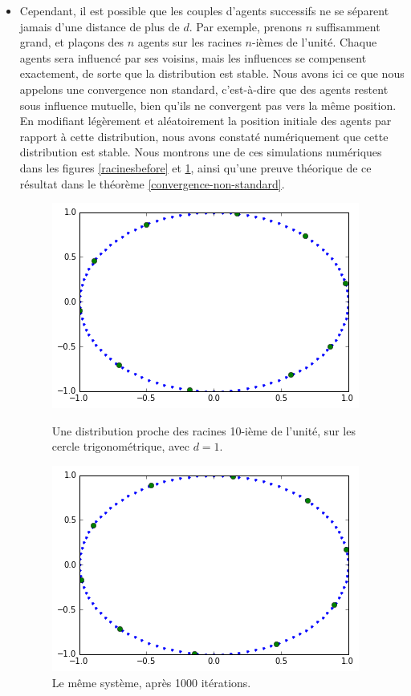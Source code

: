 \documentclass[a4paper,10pt]{article}
\begin{document}
\begin{itemize}
\item Cependant, il est possible que les couples d'agents successifs ne se séparent jamais d'une distance de plus de $d$. Par exemple, prenons $n$ suffisamment grand, et plaçons des $n$ agents sur les racines $n$-ièmes de l'unité. Chaque agents sera influencé par ses voisins, mais les influences se compensent exactement, de sorte que la distribution est stable. Nous avons ici ce que nous appelons une convergence non standard, c'est-à-dire que des agents restent sous influence mutuelle, bien qu'ils ne convergent pas vers la même position.
En modifiant légèrement et aléatoirement la position initiale des agents par rapport à cette distribution, nous avons constaté numériquement que cette distribution est stable. Nous montrons une de ces simulations numériques dans les figures \ref{racinesbefore} et \ref{racines1000}, ainsi qu'une preuve théorique de ce résultat dans le théorème \ref{convergence-non-standard}.

\begin{figure}
\center
\includegraphics[scale=0.5]{racinesbefore.png}
\caption{Une distribution proche des racines 10-ième de l'unité, sur les cercle trigonométrique, avec $d=1$.}
\label{racinesbefore}
\center
\includegraphics[scale=0.5]{racines1000.png}
\caption{Le même système, après 1000 itérations.}
\label{racines1000}
\end{figure}

\end{itemize}
\end{document}
